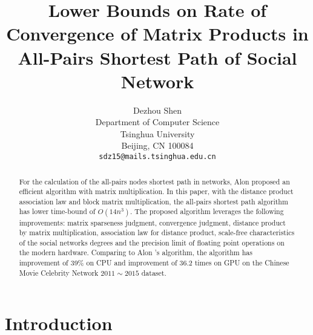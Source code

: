 \documentclass[review]{cvpr}
\begin{document}
\title{Lower Bounds on Rate of Convergence of Matrix Products in All-Pairs Shortest Path of Social Network}

\author{Dezhou Shen\\
Department of Computer Science\\
Tsinghua University\\
Beijing, CN 100084\\
{\tt\small sdz15@mails.tsinghua.edu.cn}
}

\maketitle


\begin{abstract}
  For the calculation of the all-pairs nodes shortest path in networks,
  Alon \etal proposed an efficient algorithm with matrix multiplication.
  In this paper, with the distance product association law and block matrix multiplication,
  the all-pairs shortest path algorithm has lower time-bound of $O(14n^3)$.
  The proposed algorithm leverages the following improvements:
  matrix sparseness judgment, convergence judgment, distance product by matrix multiplication, association law for distance product,
  scale-free characteristics of the social networks degrees and the precision limit of floating point operations on the modern hardware.
  Comparing to Alon \etal's algorithm, the algorithm has improvement of 39\% on CPU and improvement of 36.2 times on GPU
  on the Chinese Movie Celebrity Network $2011\sim2015$ dataset.
\end{abstract}

\section{Introduction}
\end{document}
